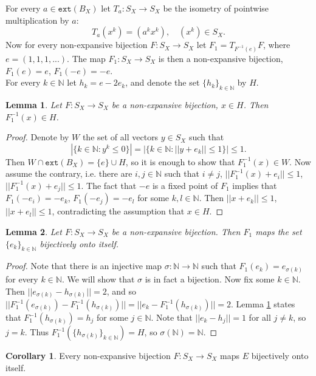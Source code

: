 \documentclass[reqno]{amsart}
\theoremstyle{plain}
\newtheorem{lemma}{Lemma}[section]
\theoremstyle{remark}
\theoremstyle{definition}
\newtheorem{corollary}{Corollary}[section]
\newcommand{\N}{\mathbb N}
\begin{document}
For every $a \in \mathtt{ext}(B_X)$ let $T_a:S_X \rightarrow S_X$ be the isometry of pointwise multiplication by $a$:
\[T_a(x^k)=(a^kx^k), \quad (x^k) \in S_X.\]
Now for every non-expansive bijection $F:S_X \rightarrow S_X$ let $F_1={ T_{F^{-1}(e)}}F$, where $e=(1,1,1,...)$. The map $F_1:S_X \rightarrow S_X$  is then a non-expansive bijection, $F_1(e)=e$, $F_1(-e)=-e$.\\
For every $k \in \N$ let $h_k=e-2e_k$, and denote the set $\{h_k\}_{k\in \N}$ by $H$.

\begin{lemma}\label{linf4}
    Let $F: S_X\rightarrow S_X$ be a non-expansive bijection, $x \in H$. Then $F_1^{-1}(x)\in H$.
\end{lemma}

\begin{proof}
    Denote by $W$ the set of all vectors $y \in S_X$ such that
    \[|\{k\in \N:y^k \leq 0\}|=|\{k \in \N:||y+e_k|| \leq 1\}|\leq 1.\]
    Then $W \cap \mathtt{ext}(B_X)= \{e\} \cup H$, so it is enough to show that $F_1^{-1}(x) \in W$. Now assume the contrary, i.e. there are $i,j \in \N$ such that $i \neq j$, $||F_1^{-1}(x)+e_i||\leq 1$, $||F_1^{-1}(x)+e_j||\leq 1$. The fact that $-e$ is a fixed point of $F_1$ implies that $F_1(-e_i)=-e_k$, $F_1(-e_j)=-e_l$ for some $k,l \in \N$. Then $||x+e_k||\leq 1$, $||x+e_l||\leq1$, contradicting the assumption that $x \in H$.
\end{proof}

\begin{lemma}\label{linf5}
     Let $F: S_X\rightarrow S_X$ be a non-expansive bijection. Then $F_1$ maps the set $\{e_k\}_{k \in \N}$ bijectively onto itself.
\end{lemma}

\begin{proof}
    Note that there is an injective map $\sigma:\N \rightarrow \N$ such that $F_1(e_k)=e_{\sigma(k)}$ for every $k \in \N$. We will show that $\sigma$ is in fact a bijection. Now fix some $k \in \N$. Then $||e_{\sigma(k)}-h_{\sigma(k)}||=2$, and so $||F_1^{-1}(e_{\sigma(k)})-F_1^{-1}(h_{\sigma(k)})||=||e_k-F_1^{-1}(h_{\sigma(k)})||=2$. Lemma \ref{linf4} states that $F_1^{-1}(h_{\sigma(k)})=h_j$ for some $j\in \N$. Note that $||e_k-h_j||=1$ for all $j \neq k$, so $j=k$. Thus $F_1^{-1}(\{h_{\sigma(k)}\}_{k\in \N})=H$, so $\sigma(\N)=\N$.
\end{proof}

\begin{corollary}
    Every non-expansive bijection $F: S_X\rightarrow S_X$ maps $E$ bijectively onto itself.
\end{corollary}
\end{document}
